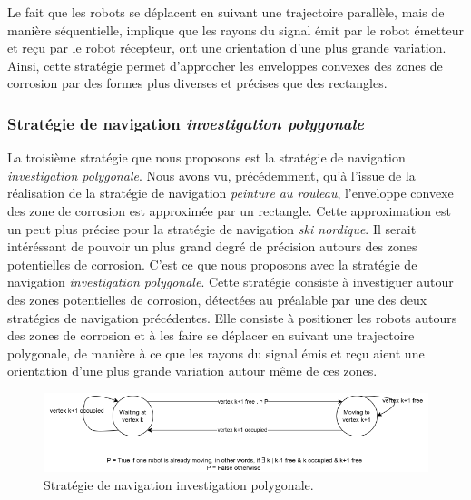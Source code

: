 \documentclass[francais,RandD]{rapportPFE}
\begin{document}
				Le fait que les robots se déplacent en suivant une trajectoire parallèle, mais de manière séquentielle, implique que les rayons du signal émit par le robot émetteur et reçu par le robot récepteur, ont une orientation d'une plus grande variation.
				Ainsi, cette stratégie permet d'approcher les enveloppes convexes des zones de corrosion par des formes plus diverses et précises que des rectangles.
			\subsubsection*{Stratégie de navigation \textit{investigation polygonale}}
				La troisième stratégie que nous proposons est la stratégie de navigation \textit{investigation polygonale}.
				Nous avons vu,  précédemment, qu'à l'issue de la réalisation de la stratégie de navigation \textit{peinture au rouleau}, l'enveloppe convexe des zone de corrosion est approximée par un rectangle.
				Cette approximation est un peut plus précise pour la stratégie de navigation \textit{ski nordique}.
				Il serait intéréssant de pouvoir un plus grand degré de précision autours des zones potentielles de corrosion.
				C'est ce que nous proposons avec la stratégie de navigation \textit{investigation polygonale}.
				Cette stratégie consiste à investiguer autour des zones potentielles de corrosion, détectées au préalable par une des deux stratégies de navigation précédentes.
				Elle consiste à positioner les robots autours des zones de corrosion et à les faire se déplacer en suivant une trajectoire polygonale, de manière à ce que les rayons du signal émis et reçu aient une orientation d'une plus grande variation autour même de ces zones.

				\begin{figure}[h!]
					\centering
					\includegraphics[scale=0.6]{graphics/automat_poly.png}
					\caption{Stratégie de navigation investigation polygonale.}
					\label{fig:automat}
				\end{figure}
\end{document}
